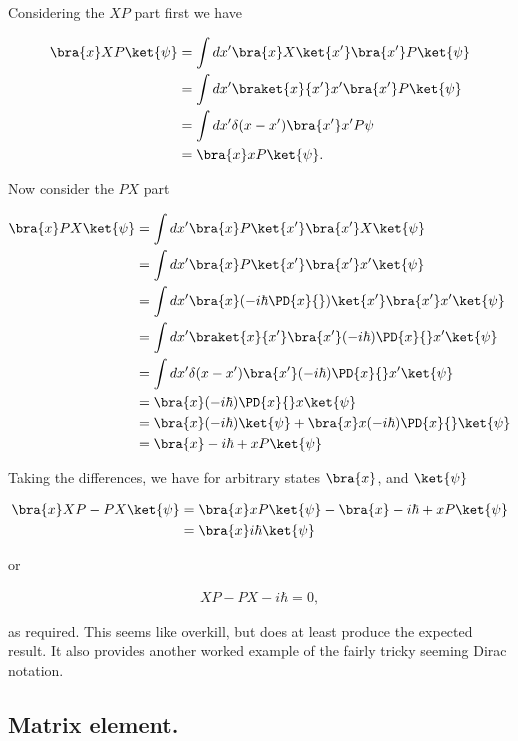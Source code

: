 Considering the $XP$ part first we have

\begin{align*}
\bra{x} XP \ket{\psi}
&=
\int dx'
\bra{x} X \ket{x'}\bra{x'} P \ket{\psi} \\
&=
\int dx'
\braket{x}{x'} x' \bra{x'} P \ket{\psi} \\
&=
\int dx'
\delta(x-x')\bra{x'}x' P {\psi}  \\
&=
\bra{x} x P \ket{\psi}.
\end{align*}

Now consider the $PX$ part

\begin{align*}
\bra{x} PX \ket{\psi}
&=
\int dx'
\bra{x} P \ket{x'}\bra{x'} X \ket{\psi}  \\
&=
\int dx'
\bra{x} P \ket{x'}\bra{x'}x' \ket{\psi}  \\
&=
\int dx'
\bra{x} (-i\hbar\PD{x}{}) \ket{x'}\bra{x'}x' \ket{\psi}  \\
&=
\int dx'
\braket{x}{x'} \bra{x'} (-i\hbar)\PD{x}{} x' \ket{\psi}  \\
&=
\int dx'
\delta(x-x') \bra{x'} (-i\hbar)\PD{x}{} x' \ket{\psi}  \\
&=
\bra{x} (-i\hbar)\PD{x}{} x \ket{\psi}  \\
&=
\bra{x} (-i\hbar) \ket{\psi} + 
\bra{x} x (-i\hbar)\PD{x}{} \ket{\psi}  \\
&=
\bra{x} -i\hbar + x P \ket{\psi}  
\end{align*}

Taking the differences, we have for arbitrary states $\bra{x}$, and $\ket{\psi}$

\begin{align*}
\bra{x} XP - PX \ket{\psi} 
&= 
\bra{x} x P \ket{\psi} -
\bra{x} -i\hbar + x P \ket{\psi} \\
&= 
\bra{x} i \hbar \ket{\psi} 
\end{align*}

or

\begin{align*}
XP - PX - i \hbar = 0,
\end{align*}

as required.  This seems like overkill, but does at least produce the expected result.  It also provides another worked example of the fairly tricky seeming Dirac notation.

\subsection{Matrix element.}

